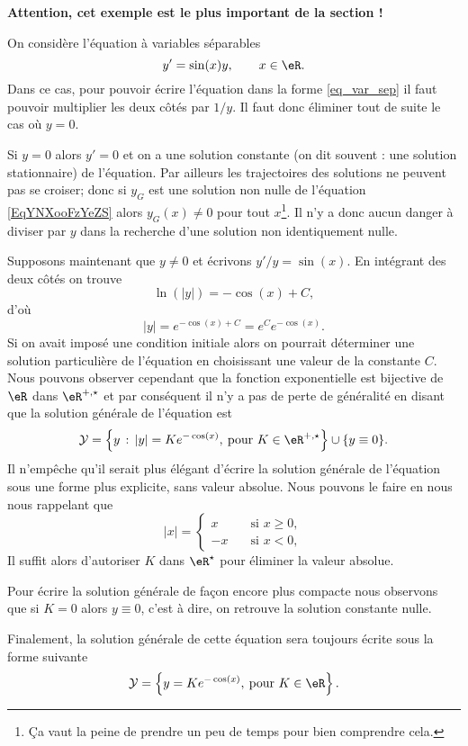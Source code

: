 \begin{example}\label{exemple_eq_hom}
	\textbf{Attention, cet exemple est le plus important de la section !}

	On considère l'équation à variables séparables
	\begin{equation}    \label{EqYNXooFzYeZS}
		y' = \sin(x) y , \qquad x\in\eR.
	\end{equation}
	Dans ce cas, pour pouvoir écrire l'équation dans la forme \eqref{eq_var_sep} il faut pouvoir multiplier les deux c\^otés par \( 1/y\). Il faut donc éliminer tout de suite le cas o\`u \( y = 0\).

	Si \( y= 0\) alors \( y' =0\) et on a une solution constante (on dit souvent : une solution stationnaire) de l'équation. Par ailleurs les trajectoires des solutions ne peuvent pas se croiser; donc si \( y_G\) est une solution non nulle de l'équation \eqref{EqYNXooFzYeZS} alors \( y_G(x)\neq 0\) pour tout \( x\)\footnote{Ça vaut la peine de prendre un peu de temps pour bien comprendre cela.}. Il n'y a donc aucun danger à diviser par \( y\) dans la recherche d'une solution non identiquement nulle.

	Supposons maintenant que \( y\neq 0\) et écrivons \( y'/y = \sin(x)\). En intégrant des deux côtés on trouve
	\[
		\ln(|y|) =- \cos(x) +C,
	\]
	d'où
	\[
		|y| = e^{- \cos(x) +C}= e^{C}e^{- \cos(x)}.
	\]
	Si on avait imposé une condition initiale alors on pourrait déterminer une solution particulière de l'équation en choisissant une valeur de la constante \( C\). Nous pouvons observer cependant que la fonction exponentielle est bijective de \( \eR\) dans \( \eR^{+,\star}\) et par conséquent il n'y a pas de perte de généralité en disant que la solution générale de l'équation est
	\begin{equation*}
		\mathcal{Y} = \left\{ y \,:\, |y| = Ke^{- \cos(x)}, \:\text{pour } K\in\eR^{+,\star}\right\}\cup\{y\equiv 0\}.
	\end{equation*}
	Il n'empêche qu'il serait plus élégant d'écrire la solution générale de l'équation sous une forme plus explicite, sans valeur absolue. Nous pouvons le faire en nous nous rappelant que
	\begin{equation*}
		|x| =  \begin{cases}
			x  & \quad\text{si } x \geq 0 , \\
			-x & \quad\text{si } x <0 ,
		\end{cases}
	\end{equation*}
	Il suffit alors d'autoriser \( K\) dans \( \eR^{\star}\) pour éliminer la valeur absolue.

	Pour écrire la solution générale de façon encore plus compacte nous observons que si \( K=0\) alors \( y \equiv 0\), c'est \`a dire, on retrouve la solution constante nulle.

	Finalement, la solution générale de cette équation sera toujours écrite sous la forme suivante
	\begin{equation}
		\mathcal{Y} = \left\{ y = Ke^{- \cos(x)}, \:\text{pour } K\in\eR\right\}.
	\end{equation}
\end{example}

